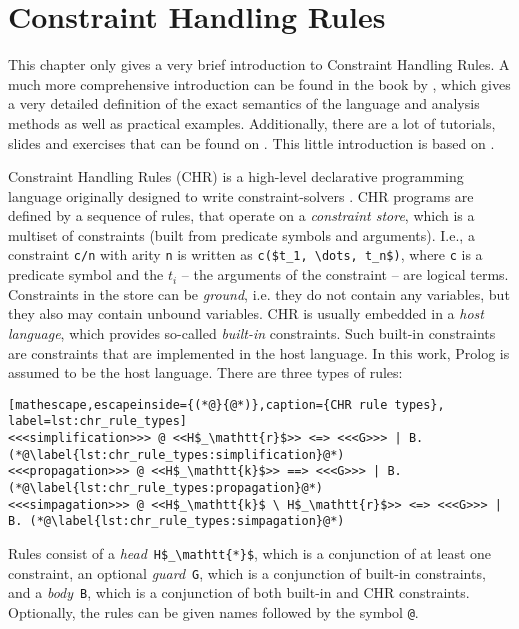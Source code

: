\chapter{Constraint Handling Rules}

This chapter only gives a very brief introduction to Constraint Handling Rules. A much more comprehensive introduction can be found in the book  by \citeauthor{fru_chr_book_2009} \cite{fru_chr_book_2009}, which gives a very detailed definition of the exact semantics of the language and analysis methods as well as practical examples. Additionally, there are a lot of tutorials, slides and exercises that can be found on  \cite{chr_homepage}. This little introduction is based on \cite{fru_chr_book_2009}.

Constraint Handling Rules (CHR) is a high-level declarative programming language originally designed to write constraint-solvers \cite[2]{chr_survey_tplp10}. CHR programs are defined by a sequence of rules, that operate on a \emph{constraint store}, which is a multiset of constraints (built from predicate symbols and arguments). I.e., a constraint \lstinline|c/n| with arity \lstinline|n| is written as \lstinline[mathescape]|c($t_1, \dots, t_n$)|, where \lstinline|c| is a predicate symbol and the $t_i$ -- the arguments of the constraint -- are logical terms. Constraints in the store can be \emph{ground}, i.e. they do not contain any variables, but they also may contain unbound variables. CHR is usually embedded in a \emph{host language}, which provides so-called \emph{built-in} constraints. Such built-in constraints are constraints that are implemented in the host language. In this work, Prolog is assumed to be the host language. There are three types of rules:

\begin{lstlisting}[mathescape,escapeinside={(*@}{@*)},caption={CHR rule types}, label=lst:chr_rule_types]
<<<simplification>>> @ <<H$_\mathtt{r}$>> <=> <<<G>>> | B. (*@\label{lst:chr_rule_types:simplification}@*)
<<<propagation>>> @ <<H$_\mathtt{k}$>> ==> <<<G>>> | B. (*@\label{lst:chr_rule_types:propagation}@*)
<<<simpagation>>> @ <<H$_\mathtt{k}$ \ H$_\mathtt{r}$>> <=> <<<G>>> | B. (*@\label{lst:chr_rule_types:simpagation}@*)
\end{lstlisting}

Rules consist of a \emph{head}~\lstinline[mathescape]|H$_\mathtt{*}$|, which is a conjunction of at least one constraint, an optional \emph{guard}~\lstinline|G|, which is a conjunction of built-in constraints, and a \emph{body}~\lstinline|B|, which is a conjunction of both built-in and CHR constraints. Optionally, the rules can be given names followed by the symbol \lstinline|@|.

